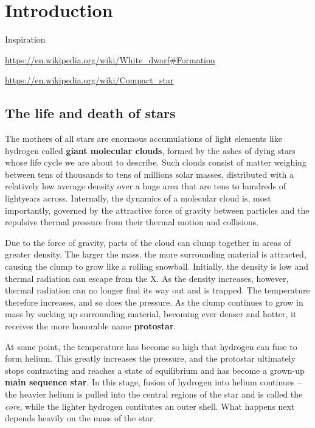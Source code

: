 \chapter*{Introduction}

Inspiration

\url{https://en.wikipedia.org/wiki/White_dwarf#Formation}

\url{https://en.wikipedia.org/wiki/Compact_star}

\section*{The life and death of stars}

The mothers of all stars are enormous accumulations of light elements like hydrogen called \textbf{giant molecular clouds}, formed by the ashes of dying stars whose life cycle we are about to describe.
Such clouds consist of matter weighing between tens of thousands to tens of millions solar masses, distributed with a relatively low average density over a huge area that are tens to hundreds of lightyears across.
Internally, the dynamics of a molecular cloud is, most importantly, governed by the attractive force of gravity between particles and the repulsive thermal pressure from their thermal motion and collisions.

Due to the force of gravity, parts of the cloud can clump together in areas of greater density.
The larger the mass, the more surrounding material is attracted, causing the clump to grow like a rolling snowball.
Initially, the density is low and thermal radiation can escape from the X.
As the density increases, however, thermal radiation can no longer find its way out and is trapped.
The temperature therefore increases, and so does the pressure.
As the clump continues to grow in mass by sucking up surrounding material, becoming ever denser and hotter, it receives the more honorable name \textbf{protostar}.

At some point, the temperature has become so high that hydrogen can fuse to form helium.
This greatly increases the pressure, and the protostar ultimately stops contracting and reaches a state of equilibrium and has become a grown-up \textbf{main sequence star}.
In this stage, fusion of hydrogen into helium continues -- the heavier helium is pulled into the central regions of the star and is called the \emph{core}, while the lighter hydrogen contitutes an outer shell.
What happens next depends heavily on the mass of the star.


